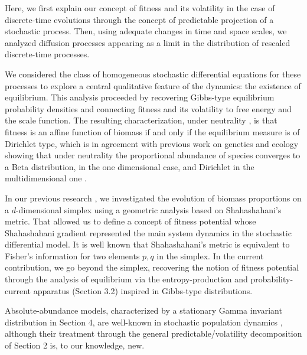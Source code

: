 \documentclass[12pt]{article}
\begin{document}
Here, we first explain our concept of fitness and its volatility in the case of discrete-time evolutions through the concept of predictable projection of a stochastic process. Then, using adequate changes in time and space scales, we analyzed diffusion processes appearing as a limit in the distribution of rescaled discrete-time processes.

We considered the class of homogeneous stochastic differential equations for these processes to explore a central qualitative feature of the dynamics: the existence of equilibrium. This analysis proceeded by recovering Gibbs-type equilibrium probability densities and connecting fitness and its volatility to free energy and the scale function. The resulting characterization, under neutrality \cite{hubbell2011unified}, is that fitness is an affine function of biomass if and only if the equilibrium measure is of Dirichlet type, which is in agreement with previous work on genetics and ecology showing that under neutrality the proportional abundance of species converges to a Beta distribution, in the one dimensional case, and Dirichlet in the multidimensional one \cite{marquet2017proportional, videla2025persistence}. 

In our previous research \cite{videla2025persistence}, we investigated the evolution of biomass proportions on a $d$-dimensional simplex using a geometric analysis based on Shahashahani's metric. That allowed us to define a concept of fitness potential whose Shahashahani gradient represented the main system dynamics in the stochastic differential model. It is well known that Shahashahani's metric is equivalent to Fisher's information for two elements $p,q$ in the simplex. In the current contribution, we go beyond the simplex, recovering the notion of fitness potential through the analysis of equilibrium via the entropy-production and probability-current apparatus (Section 3.2) inspired in Gibbs-type distributions. 

Absolute-abundance models, characterized by a stationary Gamma invariant distribution in Section 4, are well-known  in stochastic population dynamics \cite{lande2003stochastic}, although their treatment through the general predictable/volatility decomposition of Section 2 is, to our knowledge, new.
\end{document}
